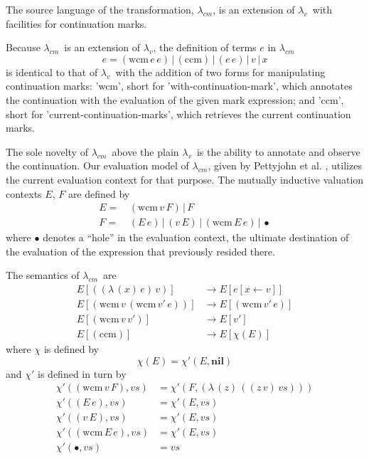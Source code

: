 \documentclass{llncs}
\newcommand{\cm}[0]{$\lambda_{cm}$}
\newcommand{\lv}[0]{$\lambda_v$}
\newcommand{\wcm}[2]{(\mathrm{wcm}\,#1\,#2)}
\newcommand{\ccm}[0]{(\mathrm{ccm})}
\newcommand{\app}[2]{(#1\,#2)}
\newcommand{\abs}[2]{(\lambda\,(#1)\,#2)}
\newcommand{\hole}[0]{\bullet}
\newcommand{\rr}[0]{\rightarrow}
\begin{document}
The source language of the transformation, \cm, is an extension of \lv\ with facilities for continuation marks.

Because \cm\ is an extension of \lv, the definition of terms $e$ in \cm\ 
\begin{equation}
e=\wcm{e}{e}\,|\,\ccm\,|\,\app{e}{e}\,|\,v\,|\,x
\end{equation}
is identical to that of \lv\ with the addition of two forms for manipulating continuation marks: \scheme'wcm', short for \scheme'with-continuation-mark', which annotates the continuation with the evaluation of the given mark expression; and \scheme'ccm', short for \scheme'current-continuation-marks', which retrieves the current continuation marks.

The sole novelty of \cm\ above the plain \lv\ is the ability to annotate and observe the continuation. Our evaluation model of \cm, given by Pettyjohn et al. \cite{pettyjohn2005continuations}, utilizes the current evaluation context for that purpose. The mutually inductive valuation contexts $E$, $F$ are defined by
\begin{align}
E=\, &\wcm{v}{F}\,|\,F\\
F=\, &\app{E}{e}\,|\,\app{v}{E}\,|\,\wcm{E}{e}\,|\,\hole
\end{align}
where $\hole$ denotes a ``hole'' in the evaluation context, the ultimate destination of the evaluation of the expression that previously resided there.

The semantics of \cm\ are
\begin{align}
E[\app{\abs{x}{e}}{v}]  &\rr E[e[x\leftarrow v]]\label{reduction}\\
E[\wcm{v}{\wcm{v'}{e}}] &\rr E[\wcm{v'}{e}]\label{tail-enforce}\\
E[\wcm{v}{v'}]          &\rr E[v']\label{wcm-body}\\
E[\ccm]                 &\rr E[\chi(E)]\label{ccm-in-context}
\end{align}
where $\chi$ is defined by
\begin{equation}
\chi(E)=\chi'(E,\mathbf{nil})
\end{equation}
and $\chi'$ is defined in turn by
\begin{align}
\chi'(\wcm{v}{F},vs) &= \chi'(F,\abs{z}{\app{\app{z}{v}}{vs}})\\
\chi'(\app{E}{e},vs) &= \chi'(E,vs)\\
\chi'(\app{v}{E},vs) &= \chi'(E,vs)\\
\chi'(\wcm{E}{e},vs) &= \chi'(E,vs)\\
\chi'(\hole,vs)      &= vs
\end{align}
\end{document}
